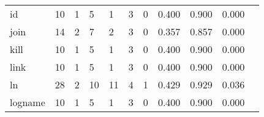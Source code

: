 \begin{longtable}{lp{1.2cm}p{1.2cm}p{1.2cm}p{1.2cm}p{1.2cm}p{1.2cm}p{1.2cm}p{1.2cm}p{1.2cm}p{1.2cm}}
id        &                                    10 &                                                  1 &                                                  5 &                                                  1 &                                                  3 &                                                  0 &                                              0.400 &                                              0.900 &                                              0.000 \\
join      &                                    14 &                                                  2 &                                                  7 &                                                  2 &                                                  3 &                                                  0 &                                              0.357 &                                              0.857 &                                              0.000 \\
kill      &                                    10 &                                                  1 &                                                  5 &                                                  1 &                                                  3 &                                                  0 &                                              0.400 &                                              0.900 &                                              0.000 \\
link      &                                    10 &                                                  1 &                                                  5 &                                                  1 &                                                  3 &                                                  0 &                                              0.400 &                                              0.900 &                                              0.000 \\
ln        &                                    28 &                                                  2 &                                                 10 &                                                 11 &                                                  4 &                                                  1 &                                              0.429 &                                              0.929 &                                              0.036 \\
logname   &                                    10 &                                                  1 &                                                  5 &                                                  1 &                                                  3 &                                                  0 &                                              0.400 &                                              0.900 &                                              0.000 \\

\end{longtable}
